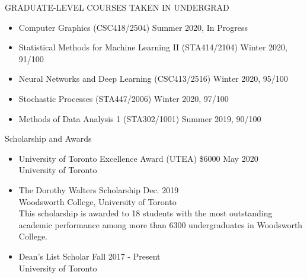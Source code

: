\documentclass{resume} %
\newcommand{\tab}[1]{\hspace{.2667\textwidth}\rlap{#1}}
\newcommand{\itab}[1]{\hspace{0em}\rlap{#1}}
\begin{document}
\begin{rSection}{GRADUATE-LEVEL COURSES TAKEN IN UNDERGRAD}
\begin{itemize}
	\item Computer Graphics (CSC418/2504) \hfill{Summer 2020, In Progress}
	\item Statistical Methods for Machine Learning II (STA414/2104) \hfill{Winter 2020, 91/100}
	\item Neural Networks and Deep Learning (CSC413/2516) \hfill{Winter 2020, 95/100}
	\item Stochastic Processes (STA447/2006) \hfill{Winter 2020, 97/100}
	\item Methods of Data Analysis 1 (STA302/1001) \hfill{Summer 2019, 90/100}
\end{itemize}
\end{rSection}

\begin{rSection}{Scholarship and Awards}
\begin{itemize}
	\item University of Toronto Excellence Award (UTEA) \$6000 \hfill{May 2020}\\
	University of Toronto
	\item The Dorothy Walters Scholarship \hfill{Dec. 2019}\\
	Woodsworth College, University of Toronto\\
	This scholarship is awarded to 18 students with the most outstanding academic performance among more than 6300 undergraduates in Woodsworth College.
	\item Dean's List Scholar \hfill{Fall 2017 - Present}\\
	University of Toronto
\end{itemize}
\end{rSection}
\end{document}
